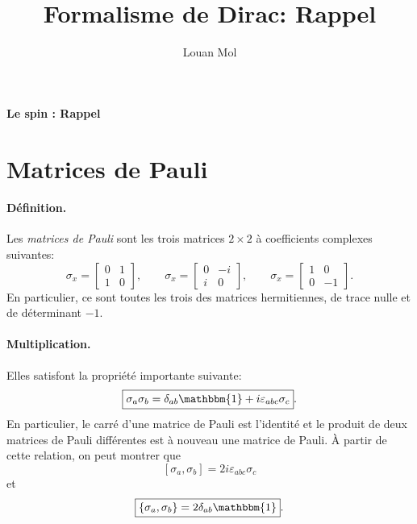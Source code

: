 \documentclass[11pt,a4paper,oneside]{article}
\title{Formalisme de Dirac: Rappel}
\author{Louan Mol}
\begin{document}
\begin{center}
    {\huge \textbf{Le spin : Rappel}}
\end{center}

\section{Matrices de Pauli}

\paragraph*{Définition.} Les \emph{matrices de Pauli} sont les trois matrices $2\times2$ à coefficients complexes suivantes:
\begin{equation}
    \sigma_x = 
    \begin{bmatrix}
        0 & 1 \\
        1 & 0
    \end{bmatrix},\qquad
    \sigma_x = 
    \begin{bmatrix}
        0 & -i \\
        i & 0
    \end{bmatrix},\qquad
    \sigma_x = 
    \begin{bmatrix}
        1 & 0 \\
        0 & -1
    \end{bmatrix}.
\end{equation}
En particulier, ce sont toutes les trois des matrices hermitiennes, de trace nulle et de déterminant $-1$.

\paragraph*{Multiplication.} Elles satisfont la propriété importante suivante:
\begin{equation}
    \boxed{\sigma_a\sigma_b=\delta_{ab}\mathbbm{1}+i\varepsilon_{abc}\sigma_c}.
\end{equation}
En particulier, le carré d'une matrice de Pauli est l'identité et le produit de deux matrices de Pauli différentes est à nouveau une matrice de Pauli. À partir de cette relation, on peut montrer que 
\begin{equation}
    \boxed{[\sigma_a,\sigma_b]=2i\varepsilon_{abc}\sigma_c}
\end{equation}
et
\begin{equation}
    \boxed{\{\sigma_a,\sigma_b\}=2\delta_{ab}\mathbbm{1}}.
\end{equation}
\end{document}
